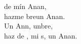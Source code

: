 \begin{cancion}%
	 de mín Anan, \\
	hazme breun Anan.\\
	Un Ann, unbre,\\
	haz de , mi s, un Anan. \\
\end{cancion}%
